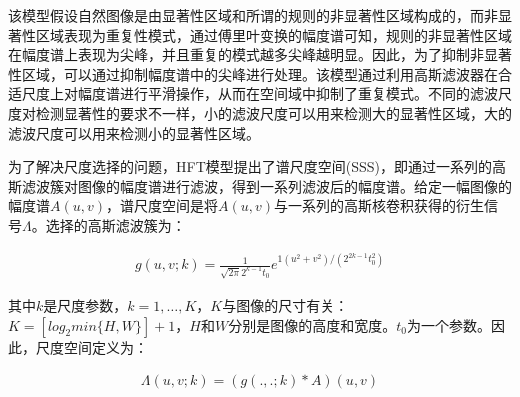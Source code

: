 该模型假设自然图像是由显著性区域和所谓的规则的非显著性区域构成的，而非显著性区域表现为重复性模式，通过傅里叶变换的幅度谱可知，规则的非显著性区域在幅度谱上表现为尖峰，并且重复的模式越多尖峰越明显。因此，为了抑制非显著性区域，可以通过抑制幅度谱中的尖峰进行处理。该模型通过利用高斯滤波器在合适尺度上对幅度谱进行平滑操作，从而在空间域中抑制了重复模式。不同的滤波尺度对检测显著性的要求不一样，小的滤波尺度可以用来检测大的显著性区域，大的滤波尺度可以用来检测小的显著性区域。

为了解决尺度选择的问题，HFT模型提出了谱尺度空间(SSS)\cite{LiJianTPAMI2013Scale}，即通过一系列的高斯滤波簇对图像的幅度谱进行滤波，得到一系列滤波后的幅度谱。给定一幅图像的幅度谱$A(u,v)$，谱尺度空间是将$A(u,v)$与一系列的高斯核卷积获得的衍生信号$\Lambda$。选择的高斯滤波簇为：
\begin{linenomath}
\begin{align}
g(u,v;k)=\frac{1}{\sqrt{2\pi}2^{k-1}t_{0}}e^{1(u^2+v^2)/(2^{2k-1}t_{0}^{2})}
\label{式3_32}
\end{align}
\end{linenomath}
其中$k$是尺度参数，$k=1,\dots,K$，$K$与图像的尺寸有关：$K=[log_{2}min\{H,W\}]+1$，$H$和$W$分别是图像的高度和宽度。$t_{0}$为一个参数。因此，尺度空间定义为：
\begin{linenomath}
\begin{align}
\Lambda(u,v;k)=(g(.,.;k)\ast A)(u,v)
\label{式3_33}
\end{align}
\end{linenomath}

